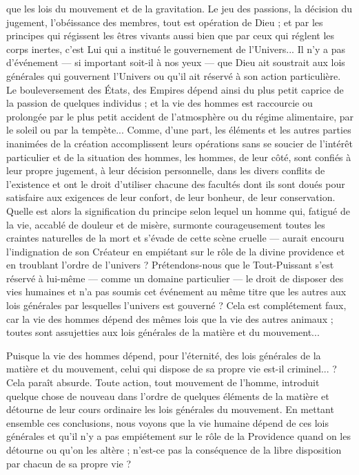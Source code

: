 que les lois du mouvement et de la gravitation. Le jeu
des passions, la décision du jugement, l’obéissance des
membres, tout est opération de Dieu ; et par les principes
qui régissent les êtres vivants aussi bien que par ceux qui
réglent les corps inertes, c’est Lui qui a institué le gouvernement
de l’Univers... Il n’y a pas d’événement — si
important soit-il à nos yeux — que Dieu ait soustrait
aux lois générales qui gouvernent l’Univers ou qu'il ait
réservé à son action particulière. Le bouleversement des
États, des Empires dépend ainsi du plus petit caprice
de la passion de quelques individus ; et la vie des hommes
est raccourcie ou prolongée par le plus petit accident de
l'atmosphère ou du régime alimentaire, par le soleil ou
par la tempète... Comme, d’une part, les éléments et les
autres parties inanimées de la création accomplissent leurs
opérations sans se soucier de l'intérêt particulier et de la
situation des hommes, les hommes, de leur côté, sont
confiés à leur propre jugement, à leur décision personnelle,
dans les divers conflits de l'existence et ont le droit d'utiliser
chacune des facultés dont ils sont doués pour satisfaire
aux exigences de leur confort, de leur bonheur,
de leur conservation. Quelle est alors la signification du
principe selon lequel un homme qui, fatigué de la vie,
accablé de douleur et de misère, surmonte courageusement
toutes les craintes naturelles de la mort et s'évade de cette
scène cruelle — aurait encouru l'indignation de son
Créateur en empiétant sur le rôle de la divine providence
et en troublant l'ordre de l'univers ? Prétendons-nous que
le Tout-Puissant s'est réservé à lui-même — comme un
domaine particulier — le droit de disposer des vies humaines
et n'a pas soumis cet événement au même titre que les
autres aux lois générales par lesquelles l'univers est
gouverné ? Cela est complétement faux, car la vie des
hommes dépend des mêmes lois que la vie des autres
animaux ; toutes sont assujetties aux lois générales de la
matière et du mouvement...

Puisque la vie des hommes dépend, pour l'éternité, des
lois générales de la matière et du mouvement, celui qui
dispose de sa propre vie est-il criminel... ? Cela paraît
absurde. Toute action, tout mouvement de l'homme,
introduit quelque chose de nouveau dans l’ordre de quelques
éléments de la matière et détourne de leur cours ordinaire
les lois générales du mouvement. En mettant ensemble
ces conclusions, nous voyons que la vie humaine dépend
de ces lois générales et qu’il n’y a pas empiétement sur
le rôle de la Providence quand on les détourne ou qu'on
les altère ; n’est-ce pas la conséquence de la libre disposition
par chacun de sa propre vie ?

